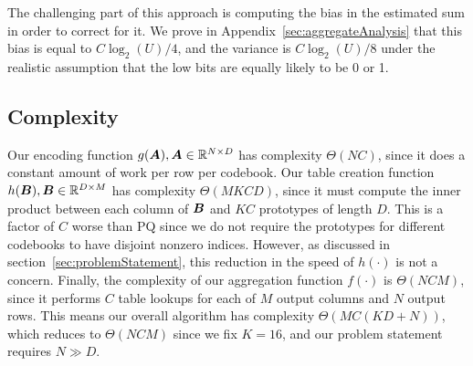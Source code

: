 The challenging part of this approach is computing the bias in the estimated sum in order to correct for it. We prove in Appendix~\ref{sec:aggregateAnalysis} that this bias is equal to $C \log_2(U) / 4$, and the variance is $C \log_2(U) / 8$ under the realistic assumption that the low bits are equally likely to be 0 or 1.

\vspace{-1.5mm}
\subsection{Complexity}
\vspace{-.5mm}

Our encoding function $g(\bm{A}), \bm{A} \in \mathbb{R}^{N \times D}$ has complexity $\Theta(NC)$, since it does a constant amount of work per row per codebook. Our table creation function $h(\bm{B}), \bm{B} \in \mathbb{R}^{D \times M}$ has complexity $\Theta(MKCD)$, since it must compute the inner product between each column of $\bm{B}$ and $KC$ prototypes of length $D$. This is a factor of $C$ worse than PQ since we do not require the prototypes for different codebooks to have disjoint nonzero indices. However, as discussed in section~\ref{sec:problemStatement}, this reduction in the speed of $h(\cdot)$ is not a concern. Finally, the complexity of our aggregation function $f(\cdot)$ is $\Theta(NCM)$, since it performs $C$ table lookups for each of $M$ output columns and $N$ output rows. This means our overall algorithm has complexity $\Theta(MC(KD + N))$, which reduces to $\Theta(NCM)$ since we fix $K = 16$, and our problem statement requires $N \gg D$.
